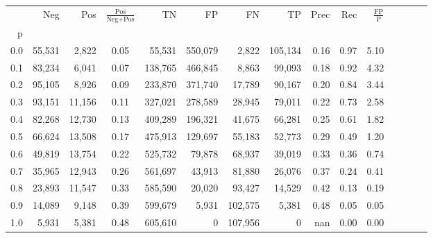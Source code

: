 \begin{tabular}{rrrcrrrrrrrrrrr}
\toprule
{} &     Neg &     Pos & $\frac{\text{Pos}}{\text{Neg}+\text{Pos}}$ &       TN &       FP &       FN &       TP &  Prec &   Rec & $\frac{\text{FP}}{\text{P}}$ \\
p   &         &         &                                            &          &          &          &          &       &       &                              \\
\midrule
0.0 &  55,531 &   2,822 &                                       0.05 &   55,531 &  550,079 &    2,822 &  105,134 &  0.16 &  0.97 &                         5.10 \\
0.1 &  83,234 &   6,041 &                                       0.07 &  138,765 &  466,845 &    8,863 &   99,093 &  0.18 &  0.92 &                         4.32 \\
0.2 &  95,105 &   8,926 &                                       0.09 &  233,870 &  371,740 &   17,789 &   90,167 &  0.20 &  0.84 &                         3.44 \\
0.3 &  93,151 &  11,156 &                                       0.11 &  327,021 &  278,589 &   28,945 &   79,011 &  0.22 &  0.73 &                         2.58 \\
0.4 &  82,268 &  12,730 &                                       0.13 &  409,289 &  196,321 &   41,675 &   66,281 &  0.25 &  0.61 &                         1.82 \\
0.5 &  66,624 &  13,508 &                                       0.17 &  475,913 &  129,697 &   55,183 &   52,773 &  0.29 &  0.49 &                         1.20 \\
0.6 &  49,819 &  13,754 &                                       0.22 &  525,732 &   79,878 &   68,937 &   39,019 &  0.33 &  0.36 &                         0.74 \\
0.7 &  35,965 &  12,943 &                                       0.26 &  561,697 &   43,913 &   81,880 &   26,076 &  0.37 &  0.24 &                         0.41 \\
0.8 &  23,893 &  11,547 &                                       0.33 &  585,590 &   20,020 &   93,427 &   14,529 &  0.42 &  0.13 &                         0.19 \\
0.9 &  14,089 &   9,148 &                                       0.39 &  599,679 &    5,931 &  102,575 &    5,381 &  0.48 &  0.05 &                         0.05 \\
1.0 &   5,931 &   5,381 &                                       0.48 &  605,610 &        0 &  107,956 &        0 &   nan &  0.00 &                         0.00 \\
\bottomrule
\end{tabular}
